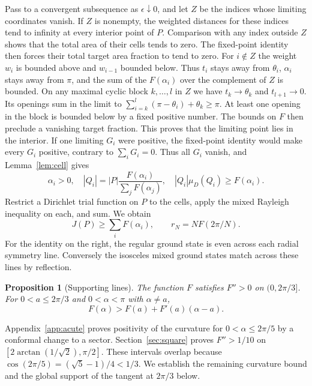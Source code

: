 \documentclass[11pt,a4paper,reqno]{amsart}
\newtheorem{proposition}[theorem]{Proposition}
\theoremstyle{remark}
\numberwithin{equation}{section}
\begin{document}
Pass to a convergent subsequence as $\epsilon\downarrow0$, and let $Z$ be the
indices whose limiting coordinates vanish. If $Z$ is nonempty, the weighted
distances for these indices tend to infinity at every interior point of $P$.
Comparison with any index outside $Z$ shows that the total area of their
cells tends to zero. The fixed-point identity then forces their total target
area fraction to tend to zero. For $i\notin Z$ the weight $w_i$ is bounded
above and $w_{i-1}$ bounded below. Thus $t_i$ stays away from $\theta_i$,
$\alpha_i$ stays away from $\pi$, and the sum of the $F(\alpha_i)$ over the
complement of $Z$ is bounded. On any maximal cyclic block $k,\ldots,l$ in
$Z$ we have $t_k\to\theta_k$ and $t_{l+1}\to0$. Its openings sum in the
limit to $\sum_{i=k}^l(\pi-\theta_i)+\theta_k\ge\pi$. At least one opening
in the block is bounded below by a fixed positive number. The bounds on
$F$ then preclude a vanishing target fraction. This proves that the limiting
point lies in the interior. If one limiting $G_i$ were positive, the
fixed-point identity would make every $G_i$ positive, contrary to $\sum_iG_i=0$.
Thus all $G_i$ vanish, and Lemma~\ref{lem:cell} gives
\begin{equation}\label{eq:cells}
 \alpha_i>0,\quad |Q_i|=|P|\frac{F(\alpha_i)}{\sum_j F(\alpha_j)},\quad
 |Q_i|\mu_D(Q_i)\ge F(\alpha_i).
\end{equation}
Restrict a Dirichlet trial function on $P$ to the cells, apply the mixed
Rayleigh inequality on each, and sum. We obtain
\begin{equation}\label{eq:sumF}
                    J(P)\ge\sum_i F(\alpha_i),\qquad r_N=N F(2\pi/N).
\end{equation}
For the identity on the right, the regular ground state is even across each
radial symmetry line. Conversely the isosceles mixed ground states match
across these lines by reflection.

\begin{proposition}[Supporting lines]\label{prop:support}
The function $F$ satisfies $F''>0$ on $(0,2\pi/3]$. For $0<a\le2\pi/3$ and
$0<\alpha<\pi$ with $\alpha\ne a$,
\begin{equation}\label{eq:fulltangent}
              F(\alpha)>F(a)+F'(a)(\alpha-a).
\end{equation}
\end{proposition}

Appendix~\ref{app:acute} proves positivity of the curvature for
$0<\alpha\le2\pi/5$ by a conformal change to a sector.
Section~\ref{sec:square} proves $F''>1/10$ on
$[2\arctan(1/\sqrt2),\pi/2]$. These intervals overlap because
$\cos(2\pi/5)=(\sqrt5-1)/4<1/3$. We establish the remaining curvature bound
and the global support of the tangent at $2\pi/3$ below.
\end{document}
